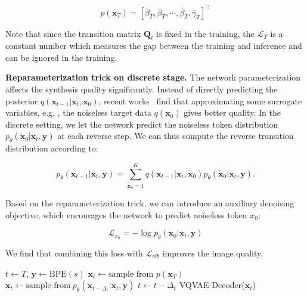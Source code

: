 \begin{equation}
	\label{eqn:prior_p_x_T}
	p(\bm{x}_T) = \left[\overline{\beta}_T, \overline{\beta}_T, \cdots, \overline{\beta}_T, \overline{\gamma}_T\right]^\top
\end{equation}

Note that since the transition matrix $\bm{Q}_t$ is fixed in the training, the $\mathcal{L}_T$ is a constant number which measures the gap between the training and inference and can be ignored in the training. 

\textbf{Reparameterization trick on discrete stage.} The network parameterization affects the synthesis quality significantly. Instead of directly predicting the posterior $q(\bm{x}_{t-1}|\bm{x}_t, \bm{x}_0)$, recent works~\cite{ho2020denoising,hoogeboom2021argmax,austin2021structured} find that approximating some surrogate  variables, e.g. , the noiseless target data $q(\bm{x}_0)$ gives better quality. In the discrete setting, we let the network predict the noiseless token distribution $p_\theta(\tilde{\bm{x}}_0 | \bm{x}_t,\bm{y})$ at each reverse step. We can thus compute the reverse transition distribution according to:

\begin{equation}

\!\!\!\! p_\theta(\bm{x}_{t-1}|\bm{x}_t,\bm{y}) = \sum_{\tilde{\bm{x}}_0=1}^{K} q(\bm{x}_{t-1}|\bm{x}_t,\tilde{\bm{x}}_0) p_\theta(\tilde{\bm{x}}_0|\bm{x}_t, \bm{y}).
\label{eqn:Reparameter_trick}
\end{equation}

Based on the reparameterization trick, we can introduce an auxiliary denoising objective, which encourages the network to predict noiseless token $x_0$:

\begin{equation}
	\mathcal{L}_{x_0} = -\log p_\theta(\bm{x}_0|\bm{x}_t,\bm{y})
\label{eqn:L_x_0}
\end{equation}

We find that combining this loss with $\mathcal{L}_{vlb}$ improves the image quality.

\begin{algorithm}[t]
	\caption{Inference of the VQ-Diffusion, given fast inference time stride $\Delta_t$, input text $s$.} \label{alg:inference}
	\begin{algorithmic}[1]
		\State $t \gets T$, $\bm{y} \gets \text{BPE}(s)$
		\State $\bm{x}_t \gets \text{sample from } p(\bm{x}_T)$ 
		\State $\bm{x}_{t} \gets  \text{sample from}~p_\theta(\bm{x}_{t-\Delta_t}|\bm{x}_t, \bm{y})$ 
		\State $t \gets t - \Delta_t$ 
		\EndWhile
		\State \Return VQVAE-Decoder($\bm{x}_t$)
	\end{algorithmic}
\end{algorithm}

